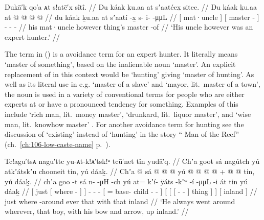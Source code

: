 \ex\label{ex:91-2-uncle-expert-hunter}%
%
\begingl
	\glpreamble	Dukā′k qo′a ᴀt s!atē′x sîtî. //
	\glpreamble	Du káak ḵu.aa at sʼaatéex̱ sitee. //
	\gla	{} Du káak {} ḵu.aa
		{} at  @ {} {}
		 @ {} @ {} @ {} //
	\glb	{} du káak {} ḵu.aa
		{} at sʼaatí -x̱ {}
		s- i-  -μμL //
	\glc	{}[  mat·uncle {}] 
		{}[  master - {}]
		- -  - //
	\gld	{} his mat·uncle {} however
		{} thing’s master -of {} 
		 {} {} {} //
	\glft	‘His uncle however was an expert hunter.’
		//
\endgl
\xe

The term  in (\lastx) is a avoidance term for an expert hunter.
It literally means ‘master of something’, based on the inalienable noun  ‘master’.
An explicit replacement of  in this context would be  ‘hunting’ giving  ‘master of hunting’.
As well as its literal use in e.g.
 ‘master of a slave’ and  ‘mayor, lit.\ master of a town’, the noun  is used in a variety of conventional terms for people who are either experts at or have a pronounced tendency for something.
Examples of this include  ‘rich man, lit.\ money master’,  ‘drunkard, lit.\ liquor master’, and  ‘wise man, lit.\ knowhow master’ \parencite[09/191]{leer:1973}.
For another avoidance term for hunting see the discussion of  ‘existing’ instead of  ‘hunting’ in the story “ Man of the Reef” (ch.\ \ref{ch:106-low-caste-name} p.\ \pageref{ex:106-2-fond-of-hunting}).

\ex\label{ex:91-3-go-around-bownarrow}%
%
\begingl
	\glpreamble	Tc!agu′tsᴀ nagu′ttc yu-ᴀt-k!ᴀ′tsk!ᵘ tcū′net tîn yudā′q. //
	\glpreamble	Chʼa goot sá nagútch yú atkʼátskʼu chooneit tin, yú dáaḵ. //
	\gla	{} Chʼa {}  @ {} {} sá {}
		 @ {} @ {} @ {} 
		{} yú  @ {} @ {} @ {} @ {} {} +
		{} {} {}  @ {} @ {} {} {} {} tin, {}
		{} yú dáaḵ. {} //
	\glb	{} chʼa {} goo -t {} sá {}
		n-  -μH -ch
		{} yú at= kʼí- ÿáts -kʼʷ -í {}
		{} {} {}  -μμL -i {} át {} tin {}
		{} yú dáaḵ {} //
	\glc	{}[ just {}[ where - {}]  {}]
		-  - -
		{}[  = base- child - - {}]
		{}[ {}[ {}[  - - {}] thing {}]  {}]
		{}[  inland {}] //
	\gld	{} just {} where -around {} ever {}
		 {} {} {}
		{} that  {} {} {} {} {}
		{} {} {}  {} {} {} {} {} with {}
		{} that inland {} //
	\glft	‘He always went around wherever, that boy, with his bow and arrow, up inland.’
		//
\endgl
\xe

